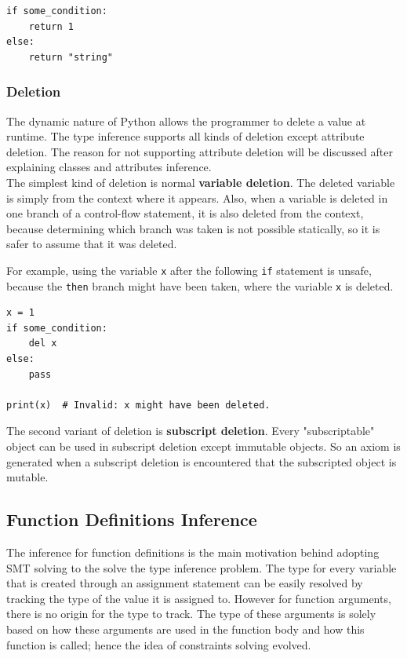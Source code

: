 \begin{lstlisting}
if some_condition:
	return 1
else:
	return "string"
\end{lstlisting}


\subsubsection{Deletion}
The dynamic nature of Python allows the programmer to delete a value at runtime. The type inference supports all kinds of deletion except attribute deletion. The reason for not supporting attribute deletion will be discussed after explaining classes and attributes inference.\\

The simplest kind of deletion is normal \textbf{variable deletion}. The deleted variable is simply from the context where it appears. Also, when a variable is deleted in one branch of a control-flow statement, it is also deleted from the context, because determining which branch was taken is not possible statically, so it is safer to assume that it was deleted.

For example, using the variable \lstinline|x| after the following \lstinline|if| statement is unsafe, because the \lstinline|then| branch might have been taken, where the variable \lstinline|x| is deleted.
\begin{lstlisting}
x = 1
if some_condition:
	del x
else:
	pass
	
print(x)  # Invalid: x might have been deleted.
\end{lstlisting}

The second variant of deletion is \textbf{subscript deletion}. Every "subscriptable" object can be used in subscript deletion except immutable objects. So an axiom is generated when a subscript deletion is encountered that the subscripted object is mutable.
\subsection{Function Definitions Inference}\label{func}
The inference for function definitions is the main motivation behind adopting SMT solving to the solve the type inference problem. The type for every variable that is created through an assignment statement can be easily resolved by tracking the type of the value it is assigned to. However for function arguments, there is no origin for the type to track. The type of these arguments is solely based on how these arguments are used in the function body and how this function is called; hence the idea of constraints solving evolved.\\

